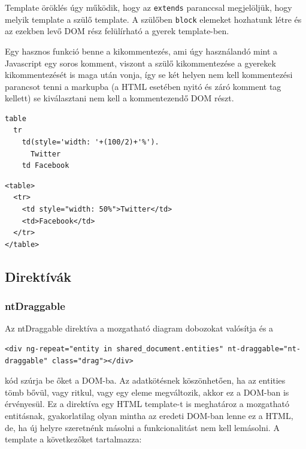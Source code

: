 Template öröklés úgy működik, hogy az \lstinline{extends} paranccsal megjelöljük, hogy melyik template a szülő template. A szülőben \lstinline{block} elemeket hozhatunk létre és az ezekben levő DOM rész felülírható a gyerek template-ben. 

Egy hasznos funkció benne a kikommentezés, ami úgy használandó mint a Javascript egy soros komment, viszont a szülő kikommentezése a gyerekek kikommentezését is maga után vonja, így se két helyen nem kell kommentezési parancsot tenni a markupba (a HTML esetében nyitó és záró komment tag kellett) se kiválasztani nem kell a kommentezendő DOM részt.

\begin{lstlisting}[caption=Példa Jade markup]
table
  tr
    td(style='width: '+(100/2)+'%').
      Twitter
    td Facebook
\end{lstlisting}

\begin{lstlisting}[caption=Az ekvivalens HTML]
<table>
  <tr>
    <td style="width: 50%">Twitter</td>
    <td>Facebook</td>
  </tr>
</table>
\end{lstlisting}

\subsection{Direktívák}

\subsubsection{ntDraggable}

Az ntDraggable direktíva a mozgatható diagram dobozokat valósítja és a 

\begin{lstlisting}
<div ng-repeat="entity in shared_document.entities" nt-draggable="nt-draggable" class="drag"></div>
\end{lstlisting}


kód szúrja be őket a DOM-ba. Az adatkötésnek köszönhetően, ha az entities tömb bővül, vagy ritkul, vagy egy eleme megváltozik, akkor ez a DOM-ban is érvényesül. Ez a direktíva egy HTML template-t is meghatároz a mozgatható entitásnak, gyakorlatilag olyan mintha az eredeti DOM-ban lenne ez a HTML, de, ha új helyre szeretnénk másolni a funkcionalitást nem kell lemásolni. A template a következőket tartalmazza:

